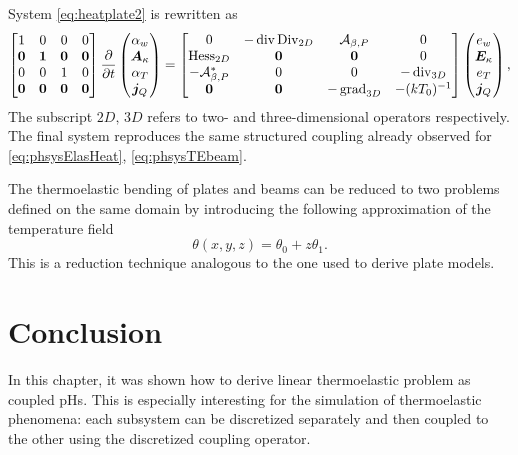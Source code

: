 System \eqref{eq:heatplate2} is rewritten as
\begin{equation}\label{eq:phsysTEplate}
\begin{bmatrix}
1 & 0 & 0 & 0\\
\bm{0} & \bm{1} & \bm{0} & \bm{0} \\
0 & 0 & 1 & 0\\
\bm{0} & \bm{0} & \bm{0} & \bm{0} \\
\end{bmatrix}
\diffp{}{t}
\begin{pmatrix}
\alpha_w \\
\bm{A}_\kappa \\
{\alpha}_T \\
\bm{j}_Q \\
\end{pmatrix} = 
\begin{bmatrix}
{0} & -\div\Div_{2D} & \mathcal{A}_{\beta, P} & {0}\\
{\Hess}_{2D} & \bm{0} & \bm{0} & {0} \\
-\mathcal{A}_{\beta, P}^* & 0 & 0 & -\div_{3D} \\
\bm{0} & \bm{0} & -\grad_{3D} & - (k T_0)^{-1} \\
\end{bmatrix}
\begin{pmatrix}
e_w \\
\bm{E}_\kappa \\
e_T \\
\bm{j}_Q \\
\end{pmatrix},
\end{equation}
The subscript $2D,\, 3D$ refers to two- and three-dimensional operators respectively. The final system reproduces the same structured coupling already observed for \eqref{eq:phsysElasHeat}, \eqref{eq:phsysTEbeam}. 

\begin{remark}
The thermoelastic bending of plates \cite{avalos2000} and beams can be reduced to two problems defined on the same domain by introducing the following approximation of the temperature field
\begin{equation}
	\theta(x,y,z) = \theta_0 + z \theta_1.
\end{equation}
This is a reduction technique analogous to the one used to derive plate models.
\end{remark}

\section{Conclusion}
In this chapter, it was shown how to derive linear thermoelastic problem as coupled pHs. This is especially interesting for the simulation of thermoelastic phenomena: each subsystem can be discretized separately and then coupled to the other using the discretized coupling operator. \\

